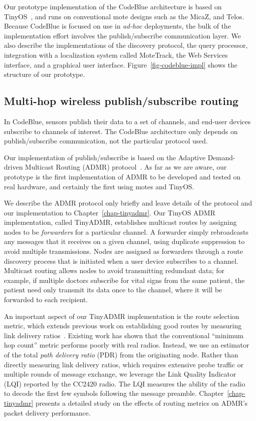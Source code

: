 Our prototype implementation of the CodeBlue architecture is based on
TinyOS~\cite{tinyos-asplos00}, and runs on conventional mote designs
such as the MicaZ, and Telos. 
Because CodeBlue is focused on use in
{\em ad-hoc} deployments, the bulk of the implementation effort
involves the publish/subscribe communication layer. We also describe
the implementations of the discovery protocol, the query processor,
integration with a localization system called MoteTrack, the Web
Services interface, and a graphical user interface.
Figure~\ref{fig-codeblue-impl} shows the structure of our prototype.

\subsection{Multi-hop wireless publish/subscribe routing}
\label{sec-cb-admr}

In CodeBlue, sensors publish their data to a set of channels, and end-user
devices subscribe to channels of interest. The CodeBlue architecture only
depends on publish/subscribe communication, not the particular protocol used. 

Our implementation of publish/subscribe is based on the Adaptive Demand-driven
Multicast Routing (ADMR) protocol~\cite{admr-mobihoc01}. As far as we are
aware, our prototype is the first implementation of ADMR to be developed and
tested on real hardware, and certainly the first using motes and TinyOS. 

We describe the ADMR protocol only briefly and leave details of the protocol
and our implementation to Chapter~\ref{chap-tinyadmr}.
Our TinyOS ADMR implementation, called TinyADMR, establishes multicast
routes by assigning nodes to be {\em forwarders} for a particular
channel. A forwarder simply rebroadcasts any messages that it receives
on a given channel, using duplicate suppression to avoid multiple
transmissions. Nodes are assigned as forwarders through a route
discovery process that is initiated when a user device subscribes to a
channel. Multicast routing allows nodes to avoid transmitting
redundant data; for example, if multiple doctors subscribe for vital
signs from the same patient, the patient need only transmit its data
once to the channel, where it will be forwarded to each recipient.

An important aspect of our TinyADMR implementation is the route
selection metric, which extends previous work on establishing good
routes by measuring link delivery ratios~\cite{etx,awoo-multihop}.
Existing work has shown that the conventional ``minimum hop count''
metric performs poorly with real radios. Instead, we use an estimator
of the total {\em path delivery ratio} (PDR) from the originating
node. Rather than directly measuring link delivery ratios, which
requires extensive probe traffic or multiple rounds of message
exchange, we leverage the Link Quality Indicator (LQI) reported by the
CC2420 radio. The LQI measures the ability
of the radio to decode the first few symbols following the message
preamble. Chapter~\ref{chap-tinyadmr} presents a detailed study on the effects
of routing metrics on ADMR's packet delivery performance. 

